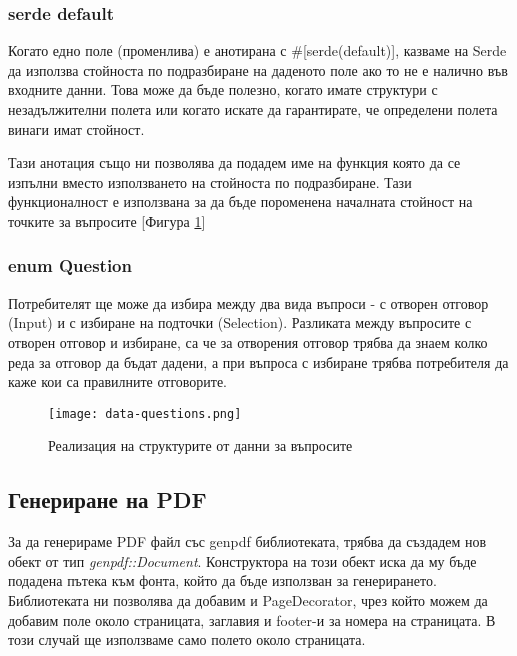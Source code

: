 \subsubsection{serde default}
Когато едно поле (променлива) е анотирана с \#[serde(default)], казваме на
Serde да използва стойноста по подразбиране на даденото поле ако то не е
налично във входните данни. Това може да бъде полезно, когато имате структури с
незадължителни полета или когато искате да гарантирате, че определени полета
винаги имат стойност. 

Тази анотация също ни позволява да подадем име на функция която да се изпълни
вместо използването на стойноста по подразбиране. Тази функционалност е използвана
за да бъде пороменена началната стойност на точките за въпросите [Фигура
\ref{fig:data-questions}]

\subsubsection{enum Question}
Потребителят ще може да избира между два вида въпроси - с отворен отговор
(Input) и с избиране на подточки (Selection). Разликата между въпросите с
отворен отговор и избиране, са че за отворения отговор трябва да знаем колко
реда за отговор да бъдат дадени, а при въпроса с избиране трябва потребителя да
каже кои са правилните отговорите.

\begin{figure}[!htb]
  \texttt{[image: data-questions.png]}
  \centering
  \caption{Реализация на структурите от данни за въпросите}
  \label{fig:data-questions}
\end{figure}

\subsection{Генериране на PDF}
За да генерираме PDF файл със genpdf библиотеката, трябва да създадем нов обект
от тип \textit{genpdf::Document}. Конструктора на този обект иска да му бъде подадена
пътека към фонта, който да бъде използван за генерирането. Библиотеката ни
позволява да добавим и PageDecorator, чрез който можем да добавим поле около
страницата, заглавия и footer-и за номера на страницата. В този случай ще
използваме само полето около страницата.

